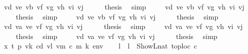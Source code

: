 \begin{isabellebody}
\ {\isacharparenleft}{\kern0pt}{}\ vd\ ve\ vb\ vf\ vg\ vh\ vi\ vj{\isacharparenright}{\kern0pt}\isanewline
\ \ \isamarkupfalse%
\ \isamarkupfalse%
\ {\isacharquery}{\kern0pt}thesis\ \isamarkupfalse%
\ simp\isanewline
{}\isamarkupfalse%
\isanewline
\ \ \isamarkupfalse%
\ {\isacharparenleft}{\kern0pt}{}\ vd\ ve\ vb\ vf\ vg\ vh\ vi\ vj{\isacharparenright}{\kern0pt}\isanewline
\ \ \isamarkupfalse%
\ \isamarkupfalse%
\ {\isacharquery}{\kern0pt}thesis\ \isamarkupfalse%
\ simp\isanewline
{}\isamarkupfalse%
\isanewline
\ \ \isamarkupfalse%
\ {\isacharparenleft}{\kern0pt}{}\ vd\ ve\ vb\ vf\ vg\ vh\ vi\ vj{\isacharparenright}{\kern0pt}\isanewline
\ \ \isamarkupfalse%
\ \isamarkupfalse%
\ {\isacharquery}{\kern0pt}thesis\ \isamarkupfalse%
\ simp\isanewline
{}\isamarkupfalse%
\isanewline
\ \ \isamarkupfalse%
\ {\isacharparenleft}{\kern0pt}{}\ vd\ va\ ve\ vf\ vg\ vh\ vi\ vj{\isacharparenright}{\kern0pt}\isanewline
\ \ \isamarkupfalse%
\ \isamarkupfalse%
\ {\isacharquery}{\kern0pt}thesis\ \isamarkupfalse%
\ simp\isanewline
{}\isamarkupfalse%
\isanewline
\ \ \isamarkupfalse%
\ {\isacharparenleft}{\kern0pt}{}\ vd\ va\ ve\ vf\ vg\ vh\ vi\ vj{\isacharparenright}{\kern0pt}\isanewline
\ \ \isamarkupfalse%
\ \isamarkupfalse%
\ {\isacharquery}{\kern0pt}thesis\ \isamarkupfalse%
\ simp\isanewline
{}\isamarkupfalse%
\isanewline
\ \ \isamarkupfalse%
\ {\isacharparenleft}{\kern0pt}{}\ vd\ va\ ve\ vf\ vg\ vh\ vi\ vj{\isacharparenright}{\kern0pt}\isanewline
\ \ \isamarkupfalse%
\ \isamarkupfalse%
\ {\isacharquery}{\kern0pt}thesis\ \isamarkupfalse%
\ simp\isanewline
{}\isamarkupfalse%
\isanewline
\ \ \isamarkupfalse%
\ {\isacharparenleft}{\kern0pt}{}\ x\ t\ p\ vk\ cd\ vl\ vm\ c\ m\ k\ env{\isacharparenright}{\kern0pt}\isanewline
\ \ \isamarkupfalse%
\ l\ \ {\isachardoublequoteopen}l\ {\isacharequal}{\kern0pt}\ ShowL\isactrlsub n\isactrlsub a\isactrlsub t\ {\isacharparenleft}{\kern0pt}toploc\ c{\isacharparenright}{\kern0pt}{\isachardoublequoteclose}\isanewline
\ \ \isamarkupfalse%

\end{isabellebody}
